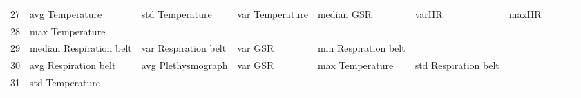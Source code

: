 \begin{landscape}
\begin{table}[]
\begin{tabular}{l|llllllll}
27       & avg Temperature         & std Temperature       & var Temperature         & median GSR              & varHR                   & maxHR                 &                      &          &                      &        \\
28       & max Temperature         &                       &                         &                         &                         &                       &                      &          &                      &        \\
29       & median Respiration belt & var Respiration belt  & var GSR                 & min Respiration belt    &                         &                       &                      &          &                      &        \\
30       & avg Respiration belt    & avg Plethysmograph    & var GSR                 & max Temperature         & std Respiration belt    &                       &                      &          &                      &        \\
31       & std Temperature         &                       &                         &                         &                         &                       &                      &          &                      &        \\     
\end{tabular}
\end{table}
\end{landscape}